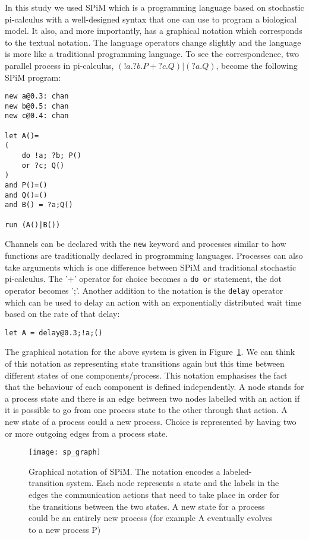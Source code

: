 In this study we used SPiM which is a programming language based on
stochastic pi-calculus with a well-designed syntax that
one can use to program a biological model. It also, and more
importantly, has a graphical notation which corresponds to the textual
notation. The language operators change slightly and the language is
more like a traditional programming language. To see the
correspondence, two parallel process in pi-calculus, $ (!a.?b.P + ?c.Q) |
(?a.Q)$, become the following SPiM program:
\begin{verbatim}
new a@0.3: chan
new b@0.5: chan
new c@0.4: chan

let A()=
(
    do !a; ?b; P()
    or ?c; Q()
)
and P()=()
and Q()=()
and B() = ?a;Q()

run (A()|B())
\end{verbatim}
Channels can be declared with the \texttt{new} keyword and processes
similar to how functions are traditionally declared in programming
languages. Processes can also take arguments which is one difference
between SPiM and traditional stochastic pi-calculus. The '+' operator for choice becomes a \texttt{do or} statement,
the dot operator becomes ';'. Another addition to the notation is the
\texttt{delay} operator which can be used to delay an action with an
exponentially distributed wait time based on the rate of that delay:
\begin{verbatim}
let A = delay@0.3;!a;()
\end{verbatim}


The graphical notation for the above
system is given in Figure~\ref{fig:sp_graph}. We can think of this
notation as representing state transitions again but this time between
different states of one components/process. This notation emphasises
the fact that the behaviour of each component is defined
independently. A node stands for a process state and there is an edge
between two nodes labelled with an action if it is possible to go from
one process state to the other through that action. A new state of a
process could a new process. Choice is represented by having two or
more outgoing edges from a process state.

\begin{figure}
\centering
\texttt{[image: sp\_graph]}
\caption[SPiM graphical notation]{Graphical notation of SPiM. The notation encodes a
  labeled-transition system. Each node represents a state and the
  labels in the edges the communication actions that need to take
  place in order for the transitions between the two states. A new
  state for a process could be an entirely new process (for example A
  eventually evolves to a new process P)}
\label{fig:sp_graph}
\end{figure}

